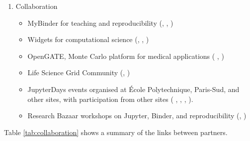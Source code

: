 \begin{enumerate}
\item Collaboration
  \begin{itemize}
  \item MyBinder for teaching and reproducibility (, , )
  \item Widgets for computational science (, , )
  \item OpenGATE, Monte Carlo platform for medical applications (
    , )
  \item Life Science Grid Community (, )
  \item JupyterDays events organised at \'Ecole Polytechnique, Paris-Sud,
  and other sites, with participation from other sites (
  , , , ).
  \item Research Bazaar workshops on Jupyter, Binder, and reproducibility
    (, )
 \end{itemize}
\end{enumerate}

Table \ref{tab:collaboration} shows a summary of the links
between partners.


